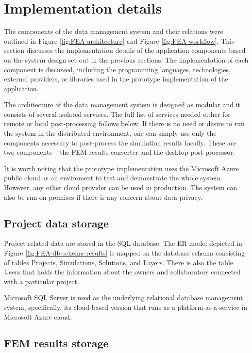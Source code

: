 \section{Implementation details}
\label{sec:implementation-details}

The components of the data management system and their relations were outlined in Figure \ref{fig:FEA-architecture} and Figure \ref{fig:FEA-workflow}. This section discusses the implementation details of the application components based on the system design set out in the previous sections. The implementation of each component is discussed, including the programming languages, technologies, external providers, or libraries used in the prototype implementation of the application.

The architecture of the data management system is designed as modular and it consists of several isolated services. The full list of services needed either for remote or local post-processing follows below. If there is no need or desire to run the system in the distributed environment, one can simply use only the components necessary to post-process the simulation results locally. These are two components -- the FEM results converter and the desktop post-processor.

It is worth noting that the prototype implementation uses the Microsoft Azure public cloud as an enviroment to test and demonstrate the whole system. However, any other cloud provider can be used in production. The system can also be run on-premises if there is any concern about data privacy.

\subsection*{Project data storage}

Project-related data are stored in the SQL database. The ER model depicted in Figure \ref{fig:FEA-db-schema-results} is mapped on the database schema consisting of tables Projects, Simulations, Solutions, and Layers. There is also the table Users that holds the information about the owners and collaborators connected with a particular project.

Microsoft SQL Server is used as the underlying relational database management system, specifically, its cloud-based version that runs as a platform-as-a-service in Microsoft Azure cloud.

\subsection*{FEM results storage}

